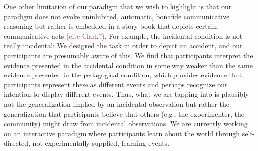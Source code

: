 \documentclass[10pt,letterpaper]{article}
\newcommand{\red}[1]{\textcolor{Red}{#1}}
\begin{document}
One other limitation of our paradigm that we wish to highlight is that our paradigm does not evoke uninhibited, automatic, bonafide communicative reasoning but rather is embedded in a story book that depicts certain communicative acts \red{(cite Clark?)}. 
For example, the incidental condition is not really incidental: We designed the task in order to depict an accident, and our participants are presumably aware of this. 
We find that participants interpret the evidence presented in the accidental condition in some way weaker than the same evidence presented in the pedagogical condition, which provides evidence that participants represent these as different events and perhaps recognize our intention to display different events. Thus, what we are tapping into is plausibly not the generalization implied by an incidental observation but rather the generalization that participants believe that others (e.g., the experimenter, the community) might draw from incidental observations. 
We are currently working on an interactive paradigm where participants learn about the world through self-directed, not experimentally supplied, learning events. 






\setlength{\bibleftmargin}{.125in}
\setlength{\bibindent}{-\bibleftmargin}


\end{document}
